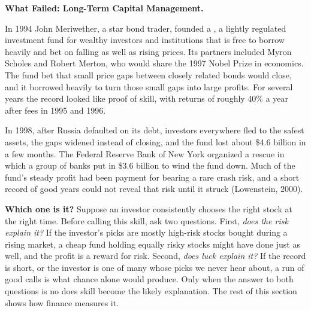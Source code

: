 \begin{callout}
\textbf{What Failed: Long-Term Capital Management.} 

In 1994 John Meriwether, a star bond trader, founded a , a lightly regulated investment fund for wealthy investors and institutions that is free to borrow heavily and bet on falling as well as rising prices. Its partners included Myron Scholes and Robert Merton, who would share the 1997 Nobel Prize in economics. The fund bet that small price gaps between closely related bonds would close, and it borrowed heavily to turn those small gaps into large profits. For several years the record looked like proof of skill, with returns of roughly 40\% a year after fees in 1995 and 1996. 

In 1998, after Russia defaulted on its debt, investors everywhere fled to the safest assets, the gaps widened instead of closing, and the fund lost about \$4.6 billion in a few months. The Federal Reserve Bank of New York organized a rescue in which a group of banks put in \$3.6 billion to wind the fund down. Much of the fund's steady profit had been payment for bearing a rare crash risk, and a short record of good years could not reveal that risk until it struck (Lowenstein, 2000).
\end{callout}



\noindent\textbf{Which one is it?} Suppose an investor
consistently chooses the right stock at the right time. Before calling this
skill, ask two questions. First, \emph{does the risk explain it?} If the
investor's picks are mostly high-risk stocks bought during a rising market,
a cheap fund holding equally risky stocks might have done just as well, and
the profit is a reward for risk. Second, \emph{does luck explain it?} If the
record is short, or the investor is one of many whose picks we never hear
about, a run of good calls is what chance alone would produce. Only when the
answer to both questions is no does skill become the likely explanation. The
rest of this section shows how finance measures it.

